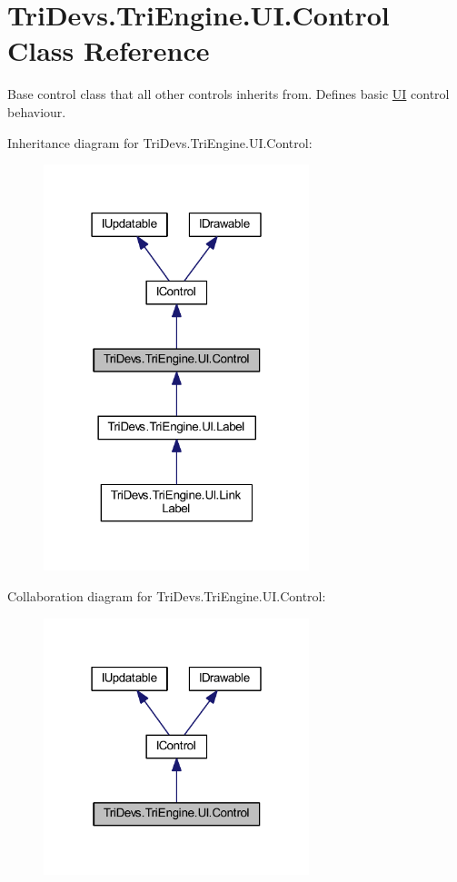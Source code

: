 \hypertarget{class_tri_devs_1_1_tri_engine_1_1_u_i_1_1_control}{\section{Tri\-Devs.\-Tri\-Engine.\-U\-I.\-Control Class Reference}
\label{class_tri_devs_1_1_tri_engine_1_1_u_i_1_1_control}
}


Base control class that all other controls inherits from. Defines basic \hyperlink{namespace_tri_devs_1_1_tri_engine_1_1_u_i}{U\-I} control behaviour.  




Inheritance diagram for Tri\-Devs.\-Tri\-Engine.\-U\-I.\-Control\-:
\nopagebreak
\begin{figure}[H]
\begin{center}
\leavevmode
\includegraphics[width=219pt]{class_tri_devs_1_1_tri_engine_1_1_u_i_1_1_control__inherit__graph}
\end{center}
\end{figure}


Collaboration diagram for Tri\-Devs.\-Tri\-Engine.\-U\-I.\-Control\-:
\nopagebreak
\begin{figure}[H]
\begin{center}
\leavevmode
\includegraphics[width=219pt]{class_tri_devs_1_1_tri_engine_1_1_u_i_1_1_control__coll__graph}
\end{center}
\end{figure}
